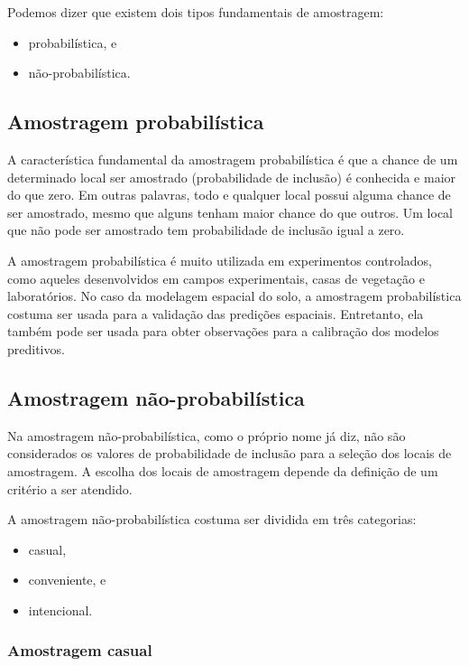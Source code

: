 \documentclass[]{book}
\providecommand{\tightlist}{%
  \setlength{\itemsep}{0pt}\setlength{\parskip}{0pt}}
\begin{document}
Podemos dizer que existem dois tipos fundamentais de amostragem:

\begin{itemize}
\tightlist
\item
  probabilística, e
\item
  não-probabilística.
\end{itemize}

\subsection{Amostragem probabilística}\label{amostragem-probabilistica}

A característica fundamental da amostragem probabilística é que a chance
de um determinado local ser amostrado (probabilidade de inclusão) é
conhecida e maior do que zero. Em outras palavras, todo e qualquer local
possui alguma chance de ser amostrado, mesmo que alguns tenham maior
chance do que outros. Um local que não pode ser amostrado tem
probabilidade de inclusão igual a zero.

A amostragem probabilística é muito utilizada em experimentos
controlados, como aqueles desenvolvidos em campos experimentais, casas
de vegetação e laboratórios. No caso da modelagem espacial do solo, a
amostragem probabilística costuma ser usada para a validação das
predições espaciais. Entretanto, ela também pode ser usada para obter
observações para a calibração dos modelos preditivos.

\subsection{Amostragem
não-probabilística}\label{amostragem-nao-probabilistica}

Na amostragem não-probabilística, como o próprio nome já diz, não são
considerados os valores de probabilidade de inclusão para a seleção dos
locais de amostragem. A escolha dos locais de amostragem depende da
definição de um critério a ser atendido.

A amostragem não-probabilística costuma ser dividida em três categorias:

\begin{itemize}
\tightlist
\item
  casual,
\item
  conveniente, e
\item
  intencional.
\end{itemize}

\subsubsection{Amostragem casual}\label{amostragem-casual}
\end{document}
